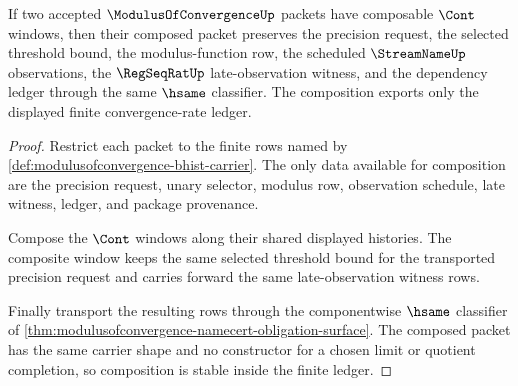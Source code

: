 \begin{theorem}\label{thm:modulusofconvergence-composition-stability}
If two accepted $\ModulusOfConvergenceUp$ packets have composable $\Cont$
windows, then their composed packet preserves the precision request, the
selected threshold bound, the modulus-function row, the scheduled
$\StreamNameUp$ observations, the $\RegSeqRatUp$ late-observation witness, and
the dependency ledger through the same $\hsame$ classifier. The composition
exports only the displayed finite convergence-rate ledger.
\end{theorem}
\begin{proof}
Restrict each packet to the finite rows named by
\autoref{def:modulusofconvergence-bhist-carrier}. The only data available for
composition are the precision request, unary selector, modulus row, observation
schedule, late witness, ledger, and package provenance.

Compose the $\Cont$ windows along their shared displayed histories. The
composite window keeps the same selected threshold bound for the transported
precision request and carries forward the same late-observation witness rows.

Finally transport the resulting rows through the componentwise $\hsame$
classifier of
\autoref{thm:modulusofconvergence-namecert-obligation-surface}. The composed
packet has the same carrier shape and no constructor for a chosen limit or
quotient completion, so composition is stable inside the finite ledger.
\end{proof}

